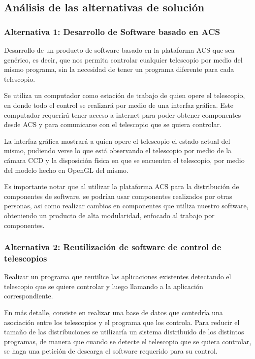 \documentclass[letterpaper,titlepage,spanish,10pt]{article}
\begin{document}
\subsection{An\'alisis de las alternativas de soluci\'on}
\subsubsection{Alternativa 1: Desarrollo de Software basado en ACS} %
Desarrollo de un producto de software basado en la plataforma ACS que sea gen\'erico,
es decir, que nos permita controlar cualquier telescopio por medio del mismo
programa, sin la necesidad de tener un programa diferente para cada telescopio.

Se utiliza un computador como estaci\'on de trabajo de quien opere el telescopio, 
en donde todo el control se realizar\'a por medio de una interfaz gr\'afica. Este
computador requerir\'a tener acceso a internet para poder obtener componentes desde
ACS y para comunicarse con el telescopio que se quiera controlar.

La interfaz gr\'afica mostrar\'a a quien opere el telescopio el estado actual del
mismo, pudiendo verse lo que est\'a observando el telescopio por medio de la
c\'amara CCD y la disposici\'on f\'isica en que se encuentra el telescopio, por medio
del modelo hecho en OpenGL del mismo.

Es importante notar que al utilizar la plataforma ACS para la distribuci\'on de 
componentes de software, se podr\'ian usar componentes realizados por otras personas, 
asi como realizar cambios en componentes que utiliza nuestro software, obteniendo un
producto de alta modularidad, enfocado al trabajo por componentes.

\subsubsection{Alternativa 2: Reutilizaci\'on de software de control de telescopios} %
Realizar un programa que reutilice las aplicaciones existentes detectando el telescopio
que se quiere controlar y luego llamando a la aplicaci\'on correspondiente.

En m\'as detalle, consiste en realizar una base de datos que contedr\'ia una 
asociaci\'on entre los telescopios y el programa que los controla. Para reducir
el tama\~no de las distribuciones se utilizar\'ia un sistema distribuido de los
distintos programas, de manera que cuando se detecte el telescopio que se quiera
controlar, se haga una petici\'on de descarga el software requerido para su control.
\end{document}
